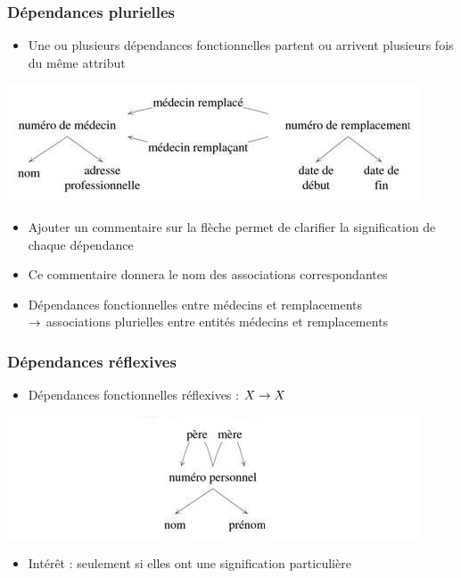 \begin{frame}
  \frametitle{Dépendances plurielles}
  \begin{itemize}
    \item Une ou plusieurs dépendances fonctionnelles partent ou arrivent plusieurs fois du même
      attribut
  \end{itemize}
  \begin{center}
    \includegraphics[width=0.9\linewidth]{dependances_plurielles.jpg}
  \end{center}
  \begin{itemize}
    \item Ajouter un commentaire sur la flèche permet de clarifier la signification de chaque dépendance
    \item Ce commentaire donnera le nom des associations correspondantes
    \item Dépendances fonctionnelles entre médecins et remplacements\\$\rightarrow$ associations plurielles entre entités médecins et remplacements
  \end{itemize}
\end{frame}

\begin{frame}
  \frametitle{Dépendances réflexives}
  \begin{itemize}
    \item Dépendances fonctionnelles réflexives : $X \rightarrow X$
  \end{itemize}
  \begin{center}
    \includegraphics[width=0.9\linewidth]{dependances_reflexives.jpg}
  \end{center}
  \begin{itemize}
    \item Intérêt : seulement si elles ont une signification particulière
  \end{itemize}
\end{frame}

